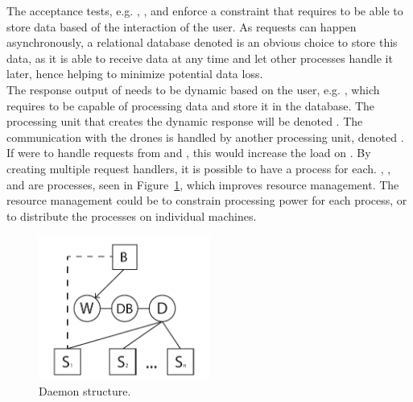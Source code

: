 The acceptance tests, e.g. , , and  enforce a constraint that requires  to be able to store data based of the interaction of the user.
As requests can happen asynchronously, a relational database denoted  is an obvious choice to store this data, as it is able to receive data at any time and let other processes handle it later, hence helping to minimize potential data loss. \\

The response output of  needs to be dynamic based on the user, e.g. , which requires  to be capable of processing data and store it in the database.
The processing unit that creates the dynamic response will be denoted .
The communication with the drones is handled by another processing unit, denoted .
If  were to handle requests from  and , this would increase the load on .
By creating multiple request handlers, it is possible to have a process for each. , , and  are processes, seen in Figure~\ref{fig:daemon_structure}, which improves resource management.
The resource management could be to constrain processing power for each process, or to distribute the processes on individual machines. \\

\begin{figure}[htb]
    \centering
    \includegraphics[width=0.5\textwidth]{gfx/daemon_structure.pdf}
    \caption{Daemon structure.}
    \label{fig:daemon_structure}
\end{figure}


